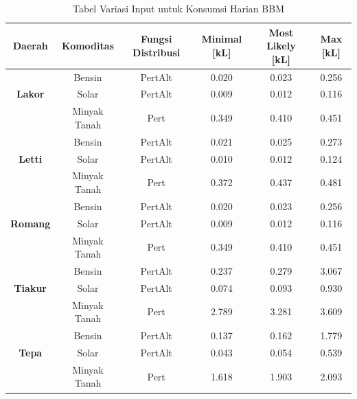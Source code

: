 \begin{table}[!ht]
    \centering
    \caption{Tabel Variasi Input untuk Konsumsi Harian BBM}
    \begin{tabular}{|c|c|c|c|c|c|}
    \hline
        \textbf{Daerah} & \textbf{Komoditas} & \textbf{Fungsi Distribusi} & \textbf{Minimal [kL]} & \textbf{Most Likely [kL]} & \textbf{Max [kL]} \\ \hline
        \textbf{} & Bensin & PertAlt & 0.020 & 0.023 & 0.256 \\ \hline
        \textbf{Lakor} & Solar & PertAlt & 0.009 & 0.012 & 0.116 \\ \hline
        \textbf{} & Minyak Tanah & Pert & 0.349 & 0.410 & 0.451 \\ \hline
        \textbf{} & Bensin & PertAlt & 0.021 & 0.025 & 0.273 \\ \hline
        \textbf{Letti} & Solar & PertAlt & 0.010 & 0.012 & 0.124 \\ \hline
        \textbf{} & Minyak Tanah & Pert & 0.372 & 0.437 & 0.481 \\ \hline
        \textbf{} & Bensin & PertAlt & 0.020 & 0.023 & 0.256 \\ \hline
        \textbf{Romang} & Solar & PertAlt & 0.009 & 0.012 & 0.116 \\ \hline
        \textbf{} & Minyak Tanah & Pert & 0.349 & 0.410 & 0.451 \\ \hline
        \textbf{} & Bensin & PertAlt & 0.237 & 0.279 & 3.067 \\ \hline
        \textbf{Tiakur} & Solar & PertAlt & 0.074 & 0.093 & 0.930 \\ \hline
        \textbf{} & Minyak Tanah & Pert & 2.789 & 3.281 & 3.609 \\ \hline
        \textbf{} & Bensin & PertAlt & 0.137 & 0.162 & 1.779 \\ \hline
        \textbf{Tepa} & Solar & PertAlt & 0.043 & 0.054 & 0.539 \\ \hline
        \textbf{} & Minyak Tanah & Pert & 1.618 & 1.903 & 2.093 \\ \hline
    \end{tabular}
    \label{tabel-data-variasi-input}
\end{table}


